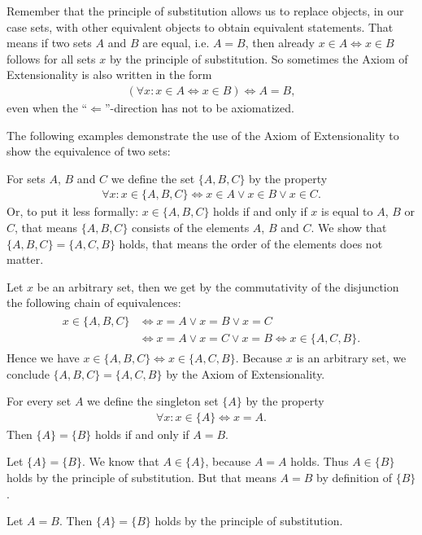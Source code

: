 Remember that the principle of substitution allows us to replace objects, in our case sets, with other equivalent objects to obtain equivalent statements. That means if two sets $A$ and $B$ are equal, i.e. $A=B$, then already $x\in A\Leftrightarrow x\in B$ follows for all sets $x$ by the principle of substitution. So sometimes the Axiom of Extensionality is also written in the form \begin{align}(\forall x\colon x\in A\Leftrightarrow x\in B)\iff A=B,\end{align}
even when the \enquote{$\Leftarrow$}-direction has not to be axiomatized.

The following examples demonstrate the use of the Axiom of Extensionality to show the equivalence of two sets:

\begin{examples}
    \begin{exampleenumerate}
        \item\label{example:sets:simple_example_a} For sets $A$, $B$ and $C$ we define the set $\{A,B,C\}$ by the property \begin{align}\forall x\colon x\in\{A,B,C\}\Leftrightarrow x\in A\lor x\in B\lor x\in C.\end{align}
        Or, to put it less formally: $x\in\{A,B,C\}$ holds if and only if $x$ is equal to $A$, $B$ or $C$, that means $\{A,B,C\}$ consists of the elements $A$, $B$ and $C$. We show that $\{A,B,C\}=\{A,C,B\}$ holds, that means the order of the elements does not matter.
        \begin{miniproof}
            Let $x$ be an arbitrary set, then we get by the commutativity of the disjunction the following chain of equivalences: \begin{align}\begin{split}x\in\{A,B,C\}&\iff x=A\lor x=B\lor x=C\\ &\iff x=A\lor x=C\lor x=B\iff x\in\{A,C,B\}.\end{split}\end{align}
            Hence we have $x\in\{A,B,C\}\iff x\in\{A,C,B\}$. Because $x$ is an arbitrary set, we conclude $\{A,B,C\}=\{A,C,B\}$ by the Axiom of Extensionality.
        \end{miniproof}
        \item\label{example:sets:simple_example_b} For every set $A$ we define the singleton set $\{A\}$ by the property \begin{align}\forall x\colon x\in\{A\}\Leftrightarrow x=A.\end{align}
        Then $\{A\}=\{B\}$ holds if and only if $A=B$.
        \begin{miniproof}
            \proofright Let $\{A\}=\{B\}$. We know that $A\in\{A\}$, because $A=A$ holds. Thus $A\in\{B\}$ holds by the principle of substitution. But that means $A=B$ by definition of $\{B\}$.
            
            \proofleft Let $A=B$. Then $\{A\}=\{B\}$ holds by the principle of substitution.
        \end{miniproof}
    \end{exampleenumerate}
\end{examples}


